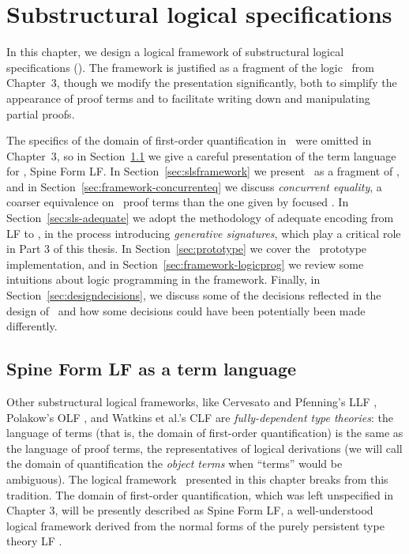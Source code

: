 \chapter{Substructural logical specifications}
\label{chapter-framework}

In this chapter, we design a logical framework of
substructural logical specifications (\sls). The framework is
justified as a fragment of the logic \ollll~from Chapter~3, though we
modify the presentation significantly, both to simplify the appearance
of proof terms and to facilitate writing down and manipulating partial
proofs.

The specifics of the domain of first-order quantification in
\ollll~were omitted in Chapter~3, so in
Section~\ref{sec:sls-termlanguage} we give a careful presentation of
the term language for \sls, Spine Form LF. 
%
In Section~\ref{sec:slsframework} we present \sls~as a fragment of
\ollll, and in Section~\ref{sec:framework-concurrenteq} we discuss
{\it concurrent equality}, a coarser equivalence on \sls~proof
terms than the one given by focused \ollll. 
%
In Section~\ref{sec:sls-adequate} we adopt the methodology of adequate
encoding from LF to \sls, in the process introducing {\it generative
  signatures}, which play a critical role in Part 3 of this thesis.
%
In Section~\ref{sec:prototype} we cover the \sls~prototype
implementation, and in Section~\ref{sec:framework-logicprog} we review
some intuitions about logic programming in the framework. 
%
Finally, in Section~\ref{sec:designdecisions}, we discuss some of the
decisions reflected in the design of \sls~and how some decisions could
have been potentially been made differently.

\section{Spine Form LF as a term language}
\label{sec:sls-termlanguage}

Other substructural logical frameworks, like Cervesato and Pfenning's
LLF \cite{cervesato02linear}, Polakow's OLF \cite{polakow01ordered},
and Watkins et al.'s CLF \cite{watkins02concurrent} are {\it
  fully-dependent type theories}: the language of terms (that is, the
domain of first-order quantification) is the same as the language of
proof terms, the representatives of logical derivations (we will call
the domain of quantification the {\it object terms} when ``terms''
would be ambiguous). The logical framework \sls~presented in this
chapter breaks from this tradition. The domain of first-order
quantification, which was left unspecified in Chapter 3, will be
presently described as Spine Form LF, a well-understood logical
framework derived from the normal forms of the purely persistent type
theory LF \cite{harper93framework}.

